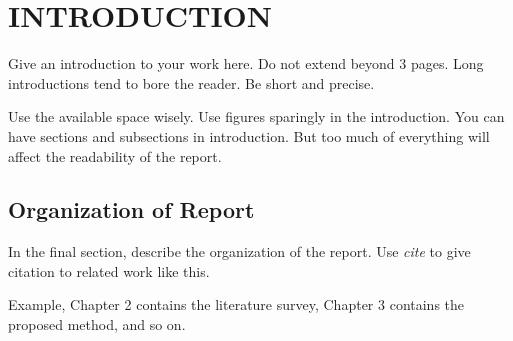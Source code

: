 
\chapter{INTRODUCTION}
\par Give an introduction to your work here. Do not extend beyond 3 pages. Long introductions tend to bore the reader. Be short and precise.

\par Use the available space wisely. Use figures sparingly in the introduction. You can have sections and subsections in introduction. But too much of everything will affect the readability of the report.

\section{Organization of Report}
\par In the final section, describe the organization of the report. Use \emph{cite} to give citation to related work like this\cite{aho2003compilers}.

\par Example, Chapter 2 contains the literature survey, Chapter 3 contains the proposed method, and so on.

\newpage
